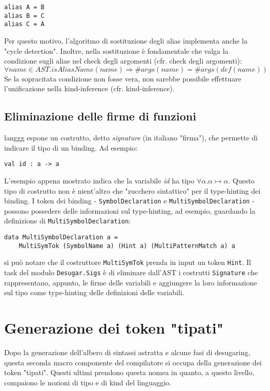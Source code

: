 \documentclass[10pt,a4paper]{article}
\begin{document}
\begin{lstlisting}
alias A = B
alias B = C
alias C = A
\end{lstlisting}

Per questo motivo, l'algoritmo di sostituzione degli alias implementa anche la "cycle detection". Inoltre, nella
sostituzione è fondamentale che valga la condizione sugli alias nel check degli argomenti (cfr. check degli argomenti):
    \[ \forall name \in AST. isAliasName(name) \Longrightarrow \#args(name) = \#args(def(name)) \]
Se la sopracitata condizione non fosse vera, non sarebbe possibile effettuare l'unificazione nella kind-inference (cfr.
kind-inference).

\subsection{Eliminazione delle firme di funzioni}
langgg espone un costrutto, detto \textit{signature} (in italiano "firma"), che permette di indicare il tipo di un
binding. Ad esempio:

\begin{lstlisting}
val id : a -> a
\end{lstlisting}

L'esempio appena mostrato indica che la variabile \textit{id} ha tipo $ \forall \alpha. \alpha \mapsto \alpha $. Questo
tipo di costrutto non è nient'altro che "zucchero sintattico" per il type-hinting dei binding. I token dei binding
- \texttt{SymbolDeclaration} e \texttt{MultiSymbolDeclaration} - possono possedere delle informazioni sul type-hinting,
ad esempio, guardando la definizione di \texttt{MultiSymbolDeclaration}:

\begin{lstlisting}
data MultiSymbolDeclaration a =
    MultiSymTok (SymbolName a) (Hint a) (MultiPatternMatch a) a
\end{lstlisting}

si può notare che il costruttore \texttt{MultiSymTok} prenda in input un token \texttt{Hint}. Il task del modulo
\texttt{Desugar.Sigs} è di eliminare dall'AST i costrutti \texttt{Signature} che rappresentano, appunto, le firme delle
variabili e aggiungere la loro informazione sul tipo come type-hinting delle definizioni delle variabili.

\section{Generazione dei token "tipati"}
Dopo la generazione dell'albero di sintassi astratta e alcune fasi di desugaring, questa seconda macro componente del
compilatore si occupa della generazione dei token "tipati". Questi ultimi prendono questa nomea in quanto, a questo
livello, compaiono le nozioni di tipo e di kind del linguaggio.
\end{document}
